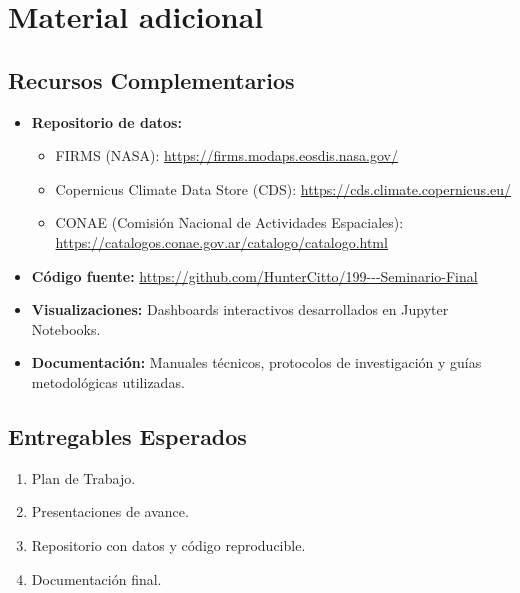 \section{Material adicional}

\subsection{Recursos Complementarios}
\begin{itemize}
    \item \textbf{Repositorio de datos:} 
    \begin{itemize}
        \item FIRMS (NASA): \url{https://firms.modaps.eosdis.nasa.gov/}
        \item Copernicus Climate Data Store (CDS): \url{https://cds.climate.copernicus.eu/}
        \item CONAE (Comisión Nacional de Actividades Espaciales): \url{https://catalogos.conae.gov.ar/catalogo/catalogo.html}
    \end{itemize}
    \item \textbf{Código fuente:} \url{https://github.com/HunterCitto/199---Seminario-Final}
    \item \textbf{Visualizaciones:} Dashboards interactivos desarrollados en Jupyter Notebooks.
    \item \textbf{Documentación:} Manuales técnicos, protocolos de investigación y guías metodológicas utilizadas.
\end{itemize}

\subsection{Entregables Esperados}
\begin{enumerate}
    \item Plan de Trabajo.
    \item Presentaciones de avance.
    \item Repositorio con datos y código reproducible.
    \item Documentación final.
\end{enumerate}